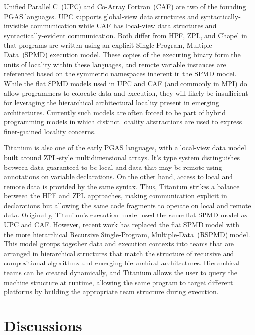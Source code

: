 Unified Parallel C~(UPC) and Co-Array Fortran~(CAF) are two of the
founding PGAS languages.  UPC supports global-view data structures and
syntactically-invisible communication while CAF has local-view data
structures and syntactically-evident communication.  Both differ from
HPF, ZPL, and Chapel in that programs are written using an explicit
Single-Program, Multiple Data~(SPMD) execution model.  These copies of
the executing binary form the units of locality within these
languages, and remote variable instances are referenced based on the
symmetric namespaces inherent in the SPMD model.  While the flat SPMD
models used in UPC and CAF (and commonly in MPI) do allow programmers
to colocate data and execution, they will likely be insufficient for
leveraging the hierarchical architectural locality present in emerging
architectures. Currently such models are often forced to be part of
hybrid programming models in which distinct locality abstractions are
used to express finer-grained locality concerns.

Titanium is also one of the early PGAS languages, with a local-view
data model built around ZPL-style multidimensional arrays. It's type
system distinguishes between data guaranteed to be local and data that
may be remote using annotations on variable declarations. On the other
hand, access to local and remote data is provided by the same syntax.
Thus, Titanium strikes a balance between the HPF and ZPL approaches,
making communication explicit in declarations but allowing the same
code fragments to operate on local and remote data. Originally,
Titanium's execution model used the same flat SPMD model as UPC and
CAF. However, recent work has replaced the flat SPMD model with the
more hierarchical Recursive Single-Program, Multiple-Data~(RSPMD)
model. This model groups together data and execution contexts into
teams that are arranged in hierarchical structures that match the
structure of recursive and compositional algorithms and emerging
hierarchical architectures. Hierarchical teams can be created
dynamically, and Titanium allows the user to query the machine
structure at runtime, allowing the same program to target different
platforms by building the appropriate team structure during execution.

\section{Discussions}

